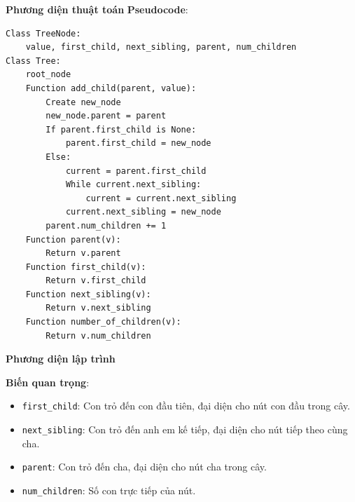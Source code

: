 \documentclass[a4paper,12pt]{article}
\begin{document}
\textbf{Phương diện thuật toán}
\textbf{Pseudocode}:
\begin{verbatim}
Class TreeNode:
    value, first_child, next_sibling, parent, num_children
Class Tree:
    root_node
    Function add_child(parent, value):
        Create new_node
        new_node.parent = parent
        If parent.first_child is None:
            parent.first_child = new_node
        Else:
            current = parent.first_child
            While current.next_sibling:
                current = current.next_sibling
            current.next_sibling = new_node
        parent.num_children += 1
    Function parent(v):
        Return v.parent
    Function first_child(v):
        Return v.first_child
    Function next_sibling(v):
        Return v.next_sibling
    Function number_of_children(v):
        Return v.num_children
\end{verbatim}

\textbf{Phương diện lập trình}

\textbf{Biến quan trọng}:
\begin{itemize}
    \item \texttt{first\_child}: Con trỏ đến con đầu tiên, đại diện cho nút con đầu trong cây.
    \item \texttt{next\_sibling}: Con trỏ đến anh em kế tiếp, đại diện cho nút tiếp theo cùng cha.
    \item \texttt{parent}: Con trỏ đến cha, đại diện cho nút cha trong cây.
    \item \texttt{num\_children}: Số con trực tiếp của nút.
\end{itemize}
\end{document}
